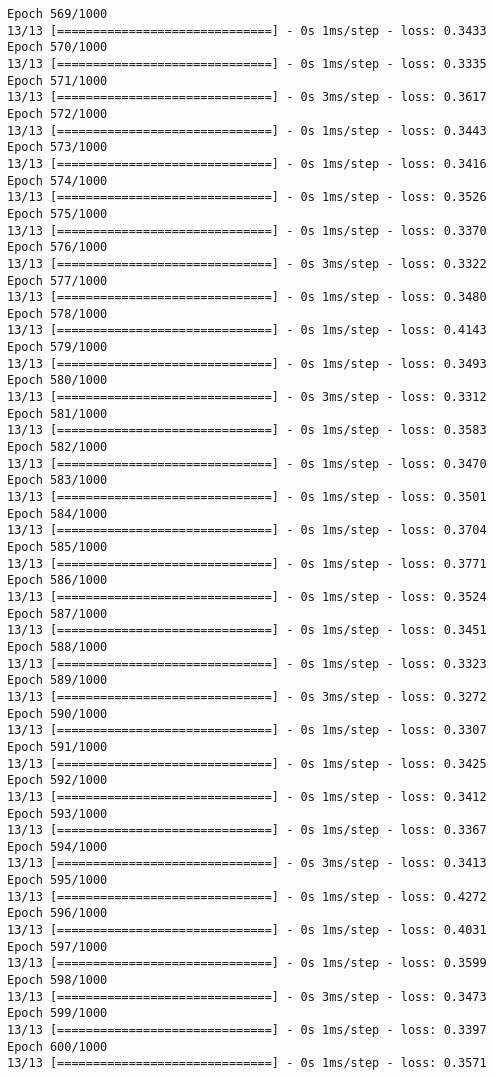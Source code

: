 \documentclass[11pt]{article}
\begin{document}
\begin{Verbatim}[commandchars=\\\{\}]
Epoch 569/1000
13/13 [==============================] - 0s 1ms/step - loss: 0.3433
Epoch 570/1000
13/13 [==============================] - 0s 1ms/step - loss: 0.3335
Epoch 571/1000
13/13 [==============================] - 0s 3ms/step - loss: 0.3617
Epoch 572/1000
13/13 [==============================] - 0s 1ms/step - loss: 0.3443
Epoch 573/1000
13/13 [==============================] - 0s 1ms/step - loss: 0.3416
Epoch 574/1000
13/13 [==============================] - 0s 1ms/step - loss: 0.3526
Epoch 575/1000
13/13 [==============================] - 0s 1ms/step - loss: 0.3370
Epoch 576/1000
13/13 [==============================] - 0s 3ms/step - loss: 0.3322
Epoch 577/1000
13/13 [==============================] - 0s 1ms/step - loss: 0.3480
Epoch 578/1000
13/13 [==============================] - 0s 1ms/step - loss: 0.4143
Epoch 579/1000
13/13 [==============================] - 0s 1ms/step - loss: 0.3493
Epoch 580/1000
13/13 [==============================] - 0s 3ms/step - loss: 0.3312
Epoch 581/1000
13/13 [==============================] - 0s 1ms/step - loss: 0.3583
Epoch 582/1000
13/13 [==============================] - 0s 1ms/step - loss: 0.3470
Epoch 583/1000
13/13 [==============================] - 0s 1ms/step - loss: 0.3501
Epoch 584/1000
13/13 [==============================] - 0s 1ms/step - loss: 0.3704
Epoch 585/1000
13/13 [==============================] - 0s 1ms/step - loss: 0.3771
Epoch 586/1000
13/13 [==============================] - 0s 1ms/step - loss: 0.3524
Epoch 587/1000
13/13 [==============================] - 0s 1ms/step - loss: 0.3451
Epoch 588/1000
13/13 [==============================] - 0s 1ms/step - loss: 0.3323
Epoch 589/1000
13/13 [==============================] - 0s 3ms/step - loss: 0.3272
Epoch 590/1000
13/13 [==============================] - 0s 1ms/step - loss: 0.3307
Epoch 591/1000
13/13 [==============================] - 0s 1ms/step - loss: 0.3425
Epoch 592/1000
13/13 [==============================] - 0s 1ms/step - loss: 0.3412
Epoch 593/1000
13/13 [==============================] - 0s 1ms/step - loss: 0.3367
Epoch 594/1000
13/13 [==============================] - 0s 3ms/step - loss: 0.3413
Epoch 595/1000
13/13 [==============================] - 0s 1ms/step - loss: 0.4272
Epoch 596/1000
13/13 [==============================] - 0s 1ms/step - loss: 0.4031
Epoch 597/1000
13/13 [==============================] - 0s 1ms/step - loss: 0.3599
Epoch 598/1000
13/13 [==============================] - 0s 3ms/step - loss: 0.3473
Epoch 599/1000
13/13 [==============================] - 0s 1ms/step - loss: 0.3397
Epoch 600/1000
13/13 [==============================] - 0s 1ms/step - loss: 0.3571

\end{Verbatim}
\end{document}
